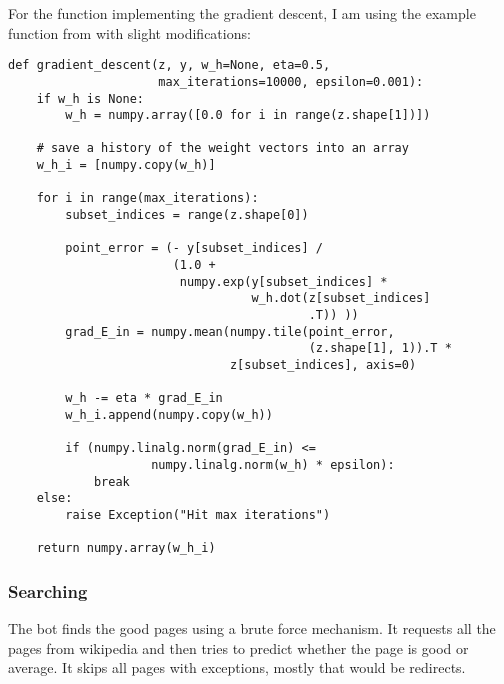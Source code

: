 For the function implementing the gradient descent, I am using the example
function from \cite{website:logistic-regression} with slight modifications:
\begin{verbatim}
def gradient_descent(z, y, w_h=None, eta=0.5,
                     max_iterations=10000, epsilon=0.001):
    if w_h is None:
        w_h = numpy.array([0.0 for i in range(z.shape[1])])

    # save a history of the weight vectors into an array
    w_h_i = [numpy.copy(w_h)]

    for i in range(max_iterations):
        subset_indices = range(z.shape[0])

        point_error = (- y[subset_indices] /
                       (1.0 +
                        numpy.exp(y[subset_indices] *
                                  w_h.dot(z[subset_indices]
                                          .T)) ))
        grad_E_in = numpy.mean(numpy.tile(point_error,
                                          (z.shape[1], 1)).T *
                               z[subset_indices], axis=0)

        w_h -= eta * grad_E_in
        w_h_i.append(numpy.copy(w_h))

        if (numpy.linalg.norm(grad_E_in) <=
                    numpy.linalg.norm(w_h) * epsilon):
            break
    else:
        raise Exception("Hit max iterations")

    return numpy.array(w_h_i)
\end{verbatim}

\subsubsection{Searching}

The bot finds the good pages using a brute force mechanism. It requests all the pages from wikipedia and then tries to predict whether the page is good or average. It skips all pages with exceptions, mostly that would be redirects.